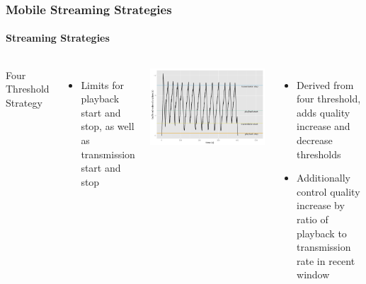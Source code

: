 \documentclass{beamer}
\begin{document}
\begin{frame}
	\frametitle{Mobile Streaming Strategies}
	\framesubtitle{Streaming Strategies}

	\begin{columns}[T]
			Four Threshold Strategy

			\begin{itemize}
				\item Limits for playback start and stop, as well as transmission start and stop
			\end{itemize}


		\includegraphics[width=\columnwidth]{../../chapters/06-mobilestreamingmeasurements/images/R-ltesim-plotbuffer-time.pdf}


		\begin{itemize}[<2->]
			\item Derived from four threshold, adds quality increase and decrease thresholds
			\item Additionally control quality increase by ratio of playback to transmission rate in recent window 
		\end{itemize}

	\end{columns}

\end{frame}


	
\end{document}
